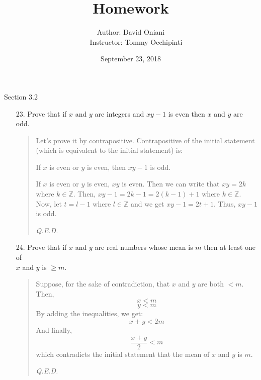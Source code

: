 \documentclass[12pt, a4paper]{article}                      %
\title{\bf{Homework \textnumero 5}}
\author{Author: David Oniani
\\
\ \ \ Instructor: Tommy Occhipinti}
\date{September 23, 2018}
\begin{document}
\maketitle

{\large Section 3.2}
\\

\begin{enumerate}
\item[23.]
Prove that if $x$ and $y$ are integers and $xy - 1$ is even then $x$ and $y$ are odd.
\begin{quote}
Let's prove it by contrapositive. Contrapositive of the initial statement (which is equivalent to the initial statement) is:
\begin{center}
If $x$ is even or $y$ is even, then $xy - 1$ is odd.
\end{center}
If $x$ is even or $y$ is even, $xy$ is even. Then we can write that $xy = 2k$ where $k \in \mathbb{Z}$.
Then, $xy - 1 = 2k - 1 = 2(k - 1) + 1$ where $k \in \mathbb{Z}$. Now, let $t = l - 1$ where $l \in \mathbb{Z}$
and we get $xy - 1 = 2t + 1$. Thus, $xy - 1$ is odd.
\begin{flushright}
\textit{Q.E.D.}
\end{flushright}
\end{quote}

\item[24.]
Prove that if $x$ and $y$ are real numbers whose mean is $m$ then at least one of\\
$x$ and $y$ is $\geq m$.
\begin{quote}
Suppose, for the sake of contradiction, that $x$ and $y$ are both $< m$.
Then,
$$x < m$$
$$y < m$$
By adding the inequalities, we get:
$$
x + y < 2m
$$
And finally,
$$
\dfrac{x + y}{2} < m
$$
which contradicts the initial statement that the mean of $x$ and $y$ is $m$.
\begin{flushright}
\textit{Q.E.D.}
\end{flushright}
\end{quote}


\end{enumerate}
\end{document}
